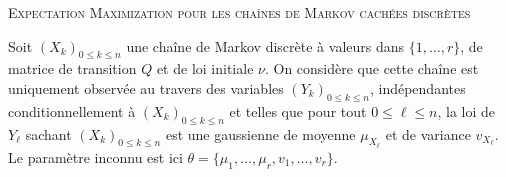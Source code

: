 \documentclass[a4paper,10pt,fleqn]{article}
\newcommand{\1}{\ensuremath{\mathbbm{1}}}
\begin{document}

\noindent\hrulefill

\begin{center}
\textsc{Expectation Maximization pour les cha\^ines de Markov cach\'ees discr\`etes}
\end{center}
\hrulefill

\medskip


Soit $(X_k)_{0\leq k\leq n}$ une cha\^ine de Markov discr\`ete \`a valeurs dans $\{1,\ldots,r\}$, de matrice de transition $Q$ et de loi initiale $\nu$. On consid\`ere que cette cha\^ine est uniquement observ\'ee au travers des variables $(Y_k)_{0\leq k\leq n}$, ind\'ependantes conditionnellement \`a $(X_k)_{0\leq k\leq n}$ et telles que pour tout $0\leq \ell\leq n$, la loi de $Y_\ell$ sachant $(X_k)_{0\leq k\leq n}$ est une gaussienne de moyenne $\mu_{X_\ell}$ et de variance $v_{X_\ell}$.
Le param\`etre inconnu est ici $\theta= \{\mu_1,\ldots,\mu_r,v_1,\ldots,v_r\}$.
\end{document}
